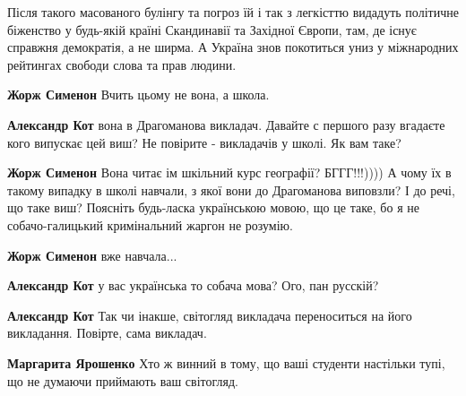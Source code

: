 \begin{itemize}
\begin{itemize}
Після такого масованого булінгу та погроз їй і так з легкісттю видадуть політичне біженство у будь-якій країні Скандинавії та Західної Європи, там, де існує справжня демократія, а не ширма. А Україна знов покотиться униз у міжнародних рейтингах свободи слова та прав людини.


\textbf{Жорж Сименон} Вчить цьому не вона, а школа.


\textbf{Александр Кот} вона в Драгоманова викладач. Давайте с першого разу вгадаєте кого випускає цей виш? Не повірите - викладачів у школі. Як вам таке?


\textbf{Жорж Сименон} Вона читає ім шкільний курс географії? БГГГ!!!)))) А чому їх в такому випадку в школі навчали, з якої вони до Драгоманова виповзли? І до речі, що таке виш? Поясніть будь-ласка українською мовою, що це таке, бо я не собачо-галицький кримінальний жаргон не розумію.


\textbf{Жорж Сименон} вже навчала...


\textbf{Александр Кот} у вас українська то собача мова? Ого, пан русскій?


\textbf{Александр Кот} Так чи інакше, світогляд викладача переноситься на його викладання. Повірте, сама викладач.


\textbf{Маргарита Ярошенко} Хто ж винний в тому, що ваші студенти настільки тупі, що не думаючи приймають ваш світогляд.



\end{itemize}
\end{itemize}
